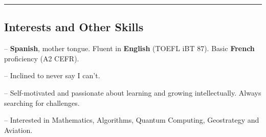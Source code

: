\documentclass[10pt,letterpaper]{article}
\newenvironment{indentsection}[1]%
{\begin{list}{}%
	{\setlength{\leftmargin}{#1}}%
	\item[]%
}
{\end{list}}
\begin{document}
\hrule
\vspace{-0.4em}
\subsection*{Interests and Other Skills}

\begin{indentsection}{\parindent}
\begin{description*}
	\item -- \textbf{Spanish}, mother tongue. Fluent in \textbf{English} (TOEFL iBT 87). Basic \textbf{French} proficiency (A2 CEFR).
	\item -- Inclined to never say I can't.
	\item -- Self-motivated and passionate about learning and growing intellectually. Always searching for challenges.
	\item -- Interested in Mathematics, Algorithms, Quantum Computing, Geostrategy and Aviation.
\end{description*}
\end{indentsection}
\end{document}
